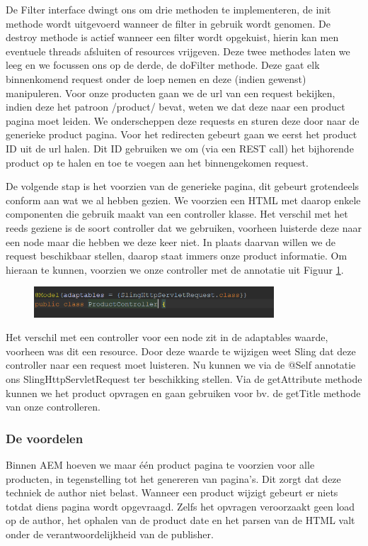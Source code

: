    De Filter interface dwingt ons om drie methoden te implementeren, de init methode wordt uitgevoerd wanneer de filter in gebruik wordt genomen. De destroy methode is actief wanneer een filter wordt opgekuist, hierin kan men eventuele threads afsluiten of resources vrijgeven. Deze twee methodes laten we leeg en we focussen ons op de derde, de doFilter methode. Deze gaat elk binnenkomend request onder de loep nemen en deze (indien gewenst) manipuleren. Voor onze producten gaan we de url van een request bekijken, indien deze het patroon \textquotedbl /product/\textquotedbl{} bevat, weten we dat deze naar een product pagina moet leiden. We onderscheppen deze requests en sturen deze door naar de generieke product pagina. Voor het redirecten gebeurt gaan we eerst het product ID uit de url halen. Dit ID gebruiken we om (via een REST call) het bijhorende product op te halen en toe te voegen aan het binnengekomen request.
    \par
    De volgende stap is het voorzien van de generieke pagina, dit gebeurt grotendeels conform aan wat we al hebben gezien. We voorzien een HTML met daarop enkele componenten die gebruik maakt van een controller klasse. Het verschil met het reeds geziene is de soort controller dat we gebruiken, voorheen luisterde deze naar een node maar die hebben we deze keer niet. In plaats daarvan willen we de request beschikbaar stellen, daarop staat immers onze product informatie. Om hieraan te kunnen, voorzien we onze controller met de annotatie uit Figuur \ref{fig:request-controller}.

    \begin{figure}[h!]
  		\includegraphics[width=0.8\textwidth]{images/request-controller.PNG}
  		\label{fig:request-controller}
	\end{figure}
    
    Het verschil met een controller voor een node zit in de \textquotedbl adaptables\textquotedbl{} waarde, voorheen was dit een resource. Door deze waarde te wijzigen weet Sling dat deze controller naar een request moet luisteren. Nu kunnen we via de \textquotedbl @Self\textquotedbl{} annotatie ons SlingHttpServletRequest ter beschikking stellen. Via de getAttribute methode kunnen we het product opvragen en gaan gebruiken voor bv. de getTitle methode van onze controlleren. 
	\subsubsection{De voordelen}
    Binnen AEM hoeven we maar \'e\'en product pagina te voorzien voor alle producten, in tegenstelling tot het genereren van pagina's. Dit zorgt dat deze techniek de author niet belast. Wanneer een product wijzigt gebeurt er niets totdat diens pagina wordt opgevraagd. Zelfs het opvragen veroorzaakt geen load op de author, het ophalen van de product date en het parsen van de HTML valt onder de verantwoordelijkheid van de publisher.
